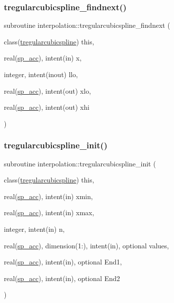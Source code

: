\subsubsection{\texorpdfstring{tregularcubicspline\+\_\+findnext()}{tregularcubicspline\_findnext()}}
{\footnotesize\ttfamily subroutine interpolation\+::tregularcubicspline\+\_\+findnext (\begin{DoxyParamCaption}\item[{class(\mbox{\hyperlink{structinterpolation_1_1tregularcubicspline}{tregularcubicspline}})}]{this,  }\item[{real(\mbox{\hyperlink{namespaceinterpolation_af72aa9a05feb8ef90b2d26e4a013abf3}{sp\+\_\+acc}}), intent(in)}]{x,  }\item[{integer, intent(inout)}]{llo,  }\item[{real(\mbox{\hyperlink{namespaceinterpolation_af72aa9a05feb8ef90b2d26e4a013abf3}{sp\+\_\+acc}}), intent(out)}]{xlo,  }\item[{real(\mbox{\hyperlink{namespaceinterpolation_af72aa9a05feb8ef90b2d26e4a013abf3}{sp\+\_\+acc}}), intent(out)}]{xhi }\end{DoxyParamCaption})}

\mbox{\label{namespaceinterpolation_ad48c755482d305cc69ce002d8d57eb5e}} 
\subsubsection{\texorpdfstring{tregularcubicspline\+\_\+init()}{tregularcubicspline\_init()}}
{\footnotesize\ttfamily subroutine interpolation\+::tregularcubicspline\+\_\+init (\begin{DoxyParamCaption}\item[{class(\mbox{\hyperlink{structinterpolation_1_1tregularcubicspline}{tregularcubicspline}})}]{this,  }\item[{real(\mbox{\hyperlink{namespaceinterpolation_af72aa9a05feb8ef90b2d26e4a013abf3}{sp\+\_\+acc}}), intent(in)}]{xmin,  }\item[{real(\mbox{\hyperlink{namespaceinterpolation_af72aa9a05feb8ef90b2d26e4a013abf3}{sp\+\_\+acc}}), intent(in)}]{xmax,  }\item[{integer, intent(in)}]{n,  }\item[{real(\mbox{\hyperlink{namespaceinterpolation_af72aa9a05feb8ef90b2d26e4a013abf3}{sp\+\_\+acc}}), dimension(1\+:), intent(in), optional}]{values,  }\item[{real(\mbox{\hyperlink{namespaceinterpolation_af72aa9a05feb8ef90b2d26e4a013abf3}{sp\+\_\+acc}}), intent(in), optional}]{End1,  }\item[{real(\mbox{\hyperlink{namespaceinterpolation_af72aa9a05feb8ef90b2d26e4a013abf3}{sp\+\_\+acc}}), intent(in), optional}]{End2 }\end{DoxyParamCaption})}




